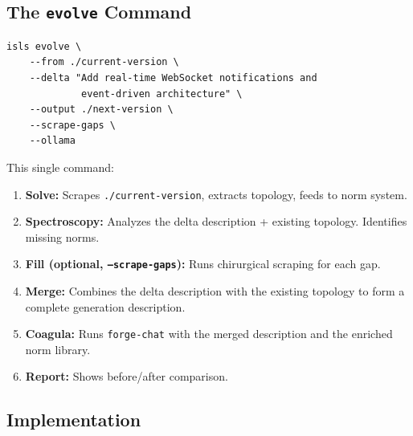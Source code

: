 \documentclass[11pt,a4paper]{article}
\begin{document}
\subsection{The \texttt{evolve} Command}

\begin{lstlisting}[style=bash]
isls evolve \
    --from ./current-version \
    --delta "Add real-time WebSocket notifications and 
             event-driven architecture" \
    --output ./next-version \
    --scrape-gaps \
    --ollama
\end{lstlisting}

This single command:

\begin{enumerate}[nosep]
\item \textbf{Solve:} Scrapes \texttt{./current-version}, 
      extracts topology, feeds to norm system.
\item \textbf{Spectroscopy:} Analyzes the delta description 
      + existing topology. Identifies missing norms.
\item \textbf{Fill (optional, \texttt{--scrape-gaps}):} 
      Runs chirurgical scraping for each gap.
\item \textbf{Merge:} Combines the delta description with 
      the existing topology to form a complete generation 
      description.
\item \textbf{Coagula:} Runs \texttt{forge-chat} with the 
      merged description and the enriched norm library.
\item \textbf{Report:} Shows before/after comparison.
\end{enumerate}

\subsection{Implementation}
\end{document}
